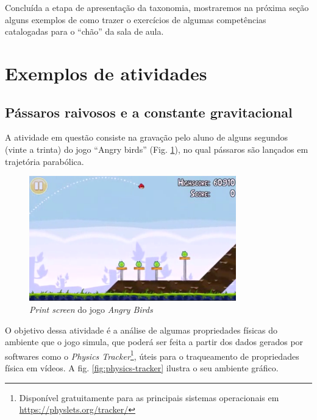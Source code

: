 Concluída a etapa de apresentação da taxonomia, mostraremos na próxima seção alguns exemplos de como trazer o exercícios de algumas competências catalogadas para o ``chão'' da sala de aula.

\section{Exemplos de atividades}

\subsection{Pássaros raivosos e a constante gravitacional}

A atividade em questão consiste na gravação pelo aluno de alguns segundos (vinte a trinta) do jogo ``Angry birds'' (Fig. \ref{fig:angry-birds}), no qual pássaros são lançados em trajetória parabólica.

\begin{figure}[!htb]
  \caption{\textit{Print screen} do jogo \textit{Angry Birds}}
  \begin{center}
    \includegraphics[width=0.8\textwidth]{imagens/angry-birds}
  \end{center}
  \label{fig:angry-birds}
\end{figure}

O objetivo dessa atividade é a análise de algumas propriedades físicas do ambiente que o jogo simula, que poderá ser feita a partir dos dados gerados por softwares como o \textit{Physics Tracker}\footnote{Disponível gratuitamente para as principais sistemas operacionais em \href{https://physlets.org/tracker/}{https://physlets.org/tracker/}}, úteis para o traqueamento de propriedades física em vídeos. A fig. \ref{fig:physics-tracker} ilustra o seu ambiente gráfico.

